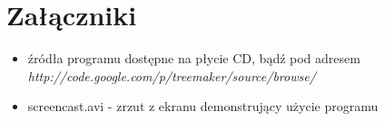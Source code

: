 \chapter*{Załączniki}
\begin{itemize}
	\item źródła programu dostępne na płycie CD, bądź pod adresem\\
	\textit{http://code.google.com/p/treemaker/source/browse/}
	\item screencast.avi - zrzut z ekranu demonstrujący użycie programu
\end{itemize}

